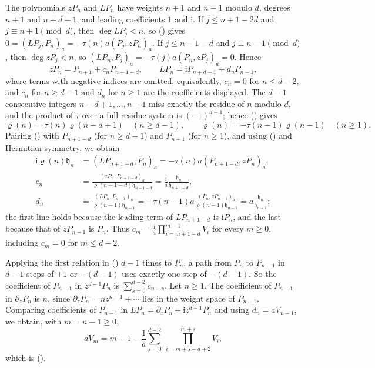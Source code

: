 \documentclass[twoside,10pt]{article}
\numberwithin{equation}{section}
\theoremstyle{slbody}
\theoremstyle{remark}
\newcommand{\ii}{\mathrm i}
\newcommand{\fh}{\mathfrak h}
\renewcommand{\eqref}[1]{%
  \textup{{\normalfont(\oldstylenums{\ref{#1}}}\normalfont)}}
\begin{document}
The polynomials \(zP_n\) and \(LP_n\) have weights \(n+1\) and \(n-1\)
modulo \(d\), degrees \(n+1\) and \(n+d-1\), and leading coefficients
\(1\) and \(\ii\).  If \(j\leq n+1-2d\) and \(j\equiv n+1\pmod d\), then
\(\deg LP_j<n\), so \eqref{eq:ibp-pairing} gives
\(0=(LP_j,P_n)_a=-\tau(n)a(P_j,zP_n)_a\).  If \(j\leq n-1-d\) and
\(j\equiv n-1\pmod d\), then \(\deg zP_j<n\), so
\((LP_n,P_j)_a=-\tau(j)a(P_n,zP_j)_a=0\).  Hence
\begin{equation}
zP_n=P_{n+1}+c_nP_{n+1-d},
\qquad
LP_n=\ii P_{n+d-1}+d_nP_{n-1},
\label{eq:polynomial-recurrences}
\end{equation}
where terms with negative indices are omitted; equivalently,
\(c_n=0\) for \(n\leq d-2\), and \(c_n\) for \(n\geq d-1\) and \(d_n\)
for \(n\geq1\) are the coefficients displayed.  The \(d-1\) consecutive
integers \(n-d+1,\ldots,n-1\) miss exactly the residue of \(n\) modulo
\(d\), and the product of \(\tau\) over a full residue system is
\((-1)^{d-1}\); hence \eqref{eq:rho-sign} gives
\[
\varrho(n)=\tau(n)\varrho(n-d+1)\quad(n\geq d-1),
\qquad
\varrho(n)=-\tau(n-1)\varrho(n-1)\quad(n\geq1).
\]
Pairing \eqref{eq:polynomial-recurrences} with \(P_{n+1-d}\) (for
\(n\geq d-1\)) and \(P_{n-1}\) (for \(n\geq1\)), and using
\eqref{eq:ibp-pairing} and Hermitian symmetry, we obtain
\[
\begin{split}
\ii\varrho(n)\fh_n
&=(LP_{n+1-d},P_n)_a
=-\tau(n)a(P_{n+1-d},zP_n)_a,\\
c_n
&=\frac{(zP_n,P_{n+1-d})_a}{\varrho(n+1-d)\fh_{n+1-d}}
=\frac{\ii}{a}\frac{\fh_n}{\fh_{n+1-d}},\\
d_n
&=\frac{(LP_n,P_{n-1})_a}{\varrho(n-1)\fh_{n-1}}
=-\tau(n-1)a
\frac{(P_n,zP_{n-1})_a}{\varrho(n-1)\fh_{n-1}}
=a\frac{\fh_n}{\fh_{n-1}};
\end{split}
\]
the first line holds because the leading term of \(LP_{n+1-d}\) is
\(\ii P_n\), and the last because that of \(zP_{n-1}\) is \(P_n\).
Thus \(c_m=\frac{\ii}{a}\prod_{i=m+1-d}^{m-1}V_i\) for every \(m\geq0\),
including \(c_m=0\) for \(m\leq d-2\).

Applying the first relation in \eqref{eq:polynomial-recurrences}
\(d-1\) times to \(P_n\), a path from \(P_n\) to \(P_{n-1}\) in \(d-1\)
steps of \(+1\) or \(-(d-1)\) uses exactly one step of \(-(d-1)\).  So
the coefficient of \(P_{n-1}\) in \(z^{d-1}P_n\) is
\(\sum_{s=0}^{d-2}c_{n+s}\).  Let \(n\geq1\).  The coefficient of
\(P_{n-1}\) in \(\partial_zP_n\) is \(n\), since
\(\partial_zP_n=nz^{n-1}+\cdots\) lies in the weight space of
\(P_{n-1}\).  Comparing coefficients of \(P_{n-1}\) in
\(LP_n=\partial_zP_n+\ii z^{d-1}P_n\) and using \(d_n=aV_{n-1}\), we
obtain, with \(m=n-1\geq0\),
\[
aV_m=m+1-\frac1a\sum_{s=0}^{d-2}\ \prod_{i=m+s-d+2}^{m+s}V_i ,
\]
which is \eqref{eq:FH-recurrence}.
\end{document}
